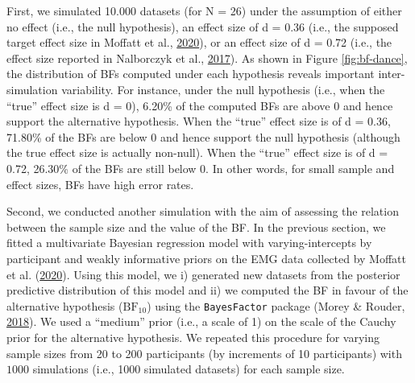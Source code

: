 \documentclass[
  english,
  man, donotrepeattitle,floatsintext]{apa6}
\begin{document}
First, we simulated 10.000 datasets (for N = 26) under the assumption of either no effect (i.e., the null hypothesis), an effect size of d = 0.36 (i.e., the supposed target effect size in Moffatt et al., \protect\hyperlink{ref-moffatt_inner_2020}{2020}), or an effect size of d = 0.72 (i.e., the effect size reported in Nalborczyk et al., \protect\hyperlink{ref-nalborczyk_orofacial_2017}{2017}). As shown in Figure \ref{fig:bf-dance}, the distribution of BFs computed under each hypothesis reveals important inter-simulation variability. For instance, under the null hypothesis (i.e., when the ``true'' effect size is d = 0), 6.20\% of the computed BFs are above 0 and hence support the alternative hypothesis. When the ``true'' effect size is of d = 0.36, 71.80\% of the BFs are below 0 and hence support the null hypothesis (although the true effect size is actually non-null). When the ``true'' effect size is of d = 0.72, 26.30\% of the BFs are still below 0. In other words, for small sample and effect sizes, BFs have high error rates.

Second, we conducted another simulation with the aim of assessing the relation between the sample size and the value of the BF. In the previous section, we fitted a multivariate Bayesian regression model with varying-intercepts by participant and weakly informative priors on the EMG data collected by Moffatt et al. (\protect\hyperlink{ref-moffatt_inner_2020}{2020}). Using this model, we i) generated new datasets from the posterior predictive distribution of this model and ii) we computed the BF in favour of the alternative hypothesis (\(\text{BF}_{10}\)) using the \texttt{BayesFactor} package (Morey \& Rouder, \protect\hyperlink{ref-R-BayesFactor}{2018}). We used a ``medium'' prior (i.e., a scale of 1) on the scale of the Cauchy prior for the alternative hypothesis. We repeated this procedure for varying sample sizes from 20 to 200 participants (by increments of 10 participants) with \(1000\) simulations (i.e., 1000 simulated datasets) for each sample size.
\end{document}
